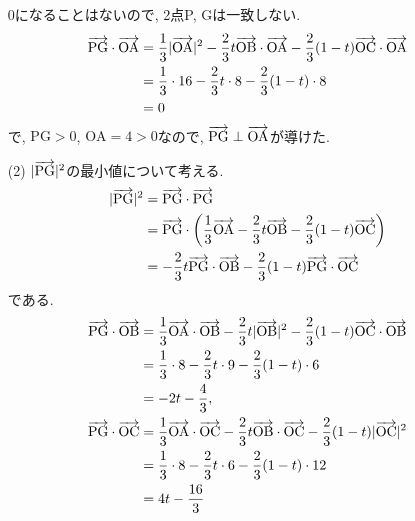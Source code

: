 \documentclass[dvipdfmx,a4paper]{jsarticle}
\begin{document}
\begin{itemize}
        0になることはないので, 2点P, Gは一致しない. 
        \begin{align*}
            \overrightarrow{\mathrm{PG}} \cdot \overrightarrow{\mathrm{OA}} &=
            \dfrac{1}{3}|\overrightarrow{\mathrm{OA}}|^2 
            - \dfrac{2}{3}t\overrightarrow{\mathrm{OB}} \cdot \overrightarrow{\mathrm{OA}} 
            - \dfrac{2}{3} (1-t)\overrightarrow{\mathrm{OC}} \cdot \overrightarrow{\mathrm{OA}} \\
            &= \dfrac{1}{3} \cdot 16 - \dfrac{2}{3}t \cdot 8 - \dfrac{2}{3} (1-t) \cdot 8 \\
            &= 0
        \end{align*}
        で, $\mathrm{PG} >0$, $\mathrm{OA}=4>0$なので, 
        $\overrightarrow{\mathrm{PG}} \perp \overrightarrow{\mathrm{OA}}$が導けた. 

        \item [(2)] $|\overrightarrow{\mathrm{PG}}|^2$の最小値について考える. 
        \begin{align*}
            |\overrightarrow{\mathrm{PG}}|^2 &= \overrightarrow{\mathrm{PG}} \cdot \overrightarrow{\mathrm{PG}} \\
            &= \overrightarrow{\mathrm{PG}} \cdot \left(\dfrac{1}{3}\overrightarrow{\mathrm{OA}} - \dfrac{2}{3}t\overrightarrow{\mathrm{OB}} - \dfrac{2}{3} (1-t)\overrightarrow{\mathrm{OC}} \right) \\
            &= - \dfrac{2}{3}t \overrightarrow{\mathrm{PG}} \cdot \overrightarrow{\mathrm{OB}} - \dfrac{2}{3} (1-t) \overrightarrow{\mathrm{PG}} \cdot \overrightarrow{\mathrm{OC}}
        \end{align*}
        である. 
        \begin{align*}
            \overrightarrow{\mathrm{PG}} \cdot \overrightarrow{\mathrm{OB}} &=
            \dfrac{1}{3}\overrightarrow{\mathrm{OA}} \cdot \overrightarrow{\mathrm{OB}} 
            - \dfrac{2}{3}t |\overrightarrow{\mathrm{OB}}|^2
            - \dfrac{2}{3} (1-t)\overrightarrow{\mathrm{OC}} \cdot \overrightarrow{\mathrm{OB}} \\
            &= \dfrac{1}{3} \cdot 8 - \dfrac{2}{3}t \cdot 9 - \dfrac{2}{3} (1-t) \cdot 6 \\
            &= -2t - \dfrac{4}{3}, \\
            \overrightarrow{\mathrm{PG}} \cdot \overrightarrow{\mathrm{OC}} &=
            \dfrac{1}{3}\overrightarrow{\mathrm{OA}} \cdot \overrightarrow{\mathrm{OC}} 
            - \dfrac{2}{3}t \overrightarrow{\mathrm{OB}} \cdot \overrightarrow{\mathrm{OC}} 
            - \dfrac{2}{3} (1-t) |\overrightarrow{\mathrm{OC}}|^2 \\
            &= \dfrac{1}{3} \cdot 8 - \dfrac{2}{3}t \cdot 6 - \dfrac{2}{3} (1-t) \cdot 12 \\
            &= 4t - \dfrac{16}{3} \\
        \end{align*}

\end{itemize}
\end{document}
